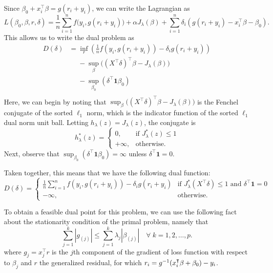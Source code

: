 \documentclass[article]{jss}
\begin{document}
Since \(\beta_0 + x_i^\intercal \beta = g(r_i + y_i)\), we can write the Lagrangian as
\[
  L(\beta_0,\beta,r,\delta) = \frac{1}{n} \sum_{i=1}^n f\big(y_i, g(r_i + y_i)\big) + \alpha J_{\lambda}(\beta) + \sum_{i=1}^n \delta_i \left(g(r_i + y_i) - x_i^\intercal \beta - \beta_0 \right).
\]
This allows us to write the dual problem as
\[
  \begin{aligned}
    D(\delta) & = \inf_r\left( \frac{1}{n} f\left(y_i, g(r_i+y_i)\right) - \delta_i g(r_i+ y_i)\right)         \\
              & \phantom{={}} - \sup_\beta \big((X^\intercal \delta)^\intercal \beta -  J_\lambda(\beta) \big) \\
              & \phantom{={}} - \sup_{\beta_0} \left( \delta^\intercal \bm{1} \beta_0\right)                   \\
  \end{aligned}
\]
Here, we can begin by noting that \(\sup_\beta \big((X^\intercal \delta)^\intercal \beta -  J_\lambda(\beta) \big)\)
is the Fenchel conjugate of the sorted \(\ell_1\) norm, which is the indicator function of the
sorted \(\ell_1\) dual norm unit ball. Letting \(h
_\lambda (z) = J_\lambda(z)\), the conjugate is
\[
  h_\lambda^*(z) = \begin{cases}
    0,       & \text{if } J^*_\lambda(z) \leq 1 \\
    +\infty, & \text{otherwise}.
  \end{cases}
\]
Next, observe that \(\sup_{\beta_0} (\delta^\intercal \bm{1} \beta_0) = \infty\) unless
\(\delta^\intercal \bm{1} = 0\).

Taken together, this means that we have the following dual function:
\begin{equation}
  D(\delta) = \begin{cases}
    \frac{1}{n} \sum_{i=1}^n f\left(y_i, g(r_i+y_i)\right) - \delta_i g(r_i+ y_i) & \text{if } J^*_\lambda(X^\intercal \delta) \leq 1 \text{ and } \delta^\intercal \bm{1} = 0 \\
    -\infty,                                                                      & \text{otherwise}.
  \end{cases}
\end{equation}

To obtain a feasible dual point for this problem, we can use the
following fact about the stationarity condition of the primal problem,
namely that
\[
  \sum_{j=1}^k | g_{(j)} | \leq \sum_{j=1}^k \lambda_j |\beta_{(j)}| \quad \forall\; k = 1,2,\dots,p.
\]
where  \(g_j = x_j^\intercal r\) is the \(j\)th component of the gradient of loss function
with respect to \(\beta_j\)
and \(r\) the generalized residual, for which \(r_i = g^{-1}(x_i^\intercal \beta + \beta_0) - y_i\).
\end{document}
